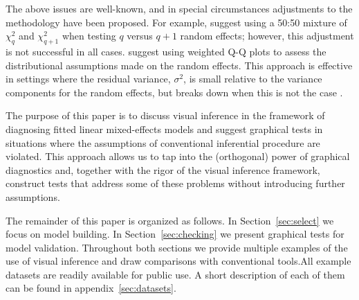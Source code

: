 \documentclass[12pt]{article} %
\newcommand{\hh}[1]{{\color{orange} #1}}
\newcommand{\al}[1]{{\color{ForestGreen} #1}}
\newcommand{\alnote}[1]{\todo[inline,color=green!40]{#1}} %
\newcommand{\hhnote}[1]{\todo[inline,color=orange!40]{#1}}
\begin{document}
\begin{description}

\end{description}

The above issues are well-known, and in special circumstances adjustments to the methodology have been proposed. For example, \cite{Stram:1994wd} suggest using a 50:50 mixture of $\chi^2_q$ and $\chi^2_{q+1}$ when testing $q$ versus $q + 1$ random effects; however, this adjustment is not successful in all cases.  \cite{Lange:1989uu} suggest using weighted Q-Q plots to assess the distributional assumptions made on the random effects. This approach is effective in settings where the residual variance, $\sigma^2$, is small relative to the variance components for the random effects, but breaks down when this is not the case \citep{adam}.
 



The purpose of this paper is to discuss visual inference in the framework of diagnosing fitted linear mixed-effects models and suggest  graphical tests in situations where the assumptions of conventional \al{inferential procedure} are violated. 
This approach allows us to  tap into the (orthogonal) power of graphical diagnostics and, together with the rigor of the visual inference framework, construct tests that address some of these problems without introducing  further assumptions. 


The remainder of this paper is organized as follows.
In Section~\ref{sec:select} we focus on model building. In Section~\ref{sec:checking} we present graphical tests for model validation. Throughout both sections we provide multiple examples of the use of visual inference and draw comparisons with conventional tools.All example datasets are readily available for public use. A short description of each of them can be found in appendix~\ref{sec:datasets}.

\end{document}
